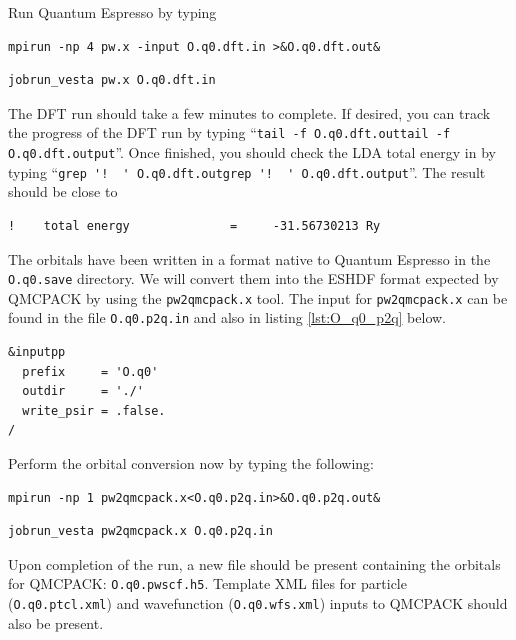 Run Quantum Espresso by typing 
\ifws
\begin{shaded}
\begin{verbatim}
mpirun -np 4 pw.x -input O.q0.dft.in >&O.q0.dft.out&
\end{verbatim}
\end{shaded}
\else
\begin{shaded}
\begin{verbatim}
jobrun_vesta pw.x O.q0.dft.in
\end{verbatim} 
\end{shaded}
\fi

The DFT run should take a few minutes to complete.  If desired, you can track the progress of the DFT run by typing ``\ifws\verb|tail -f O.q0.dft.out|\else\verb|tail -f O.q0.dft.output|\fi''. Once finished, you should check the LDA total energy in \texttt{} by typing ``\ifws\verb|grep '!  ' O.q0.dft.out|\else\verb|grep '!  ' O.q0.dft.output|\fi''.  The result should be close to
\begin{shaded}
\begin{verbatim}
!    total energy              =     -31.56730213 Ry
\end{verbatim}
\end{shaded} 

The orbitals have been written in a format native to Quantum Espresso in the \texttt{O.q0.save} directory.  We will convert them into the ESHDF format expected by QMCPACK by using the \texttt{pw2qmcpack.x} tool.  The input for \texttt{pw2qmcpack.x} can be found in the file \texttt{O.q0.p2q.in} and also in listing \ref{lst:O_q0_p2q} below. 

\begin{lstlisting}[caption={\texttt{pw2qmcpack.x} input file for orbital conversion (\texttt{O.q0.p2q.in})\label{lst:O_q0_p2q}}]
&inputpp
  prefix     = 'O.q0'
  outdir     = './'
  write_psir = .false.
/
\end{lstlisting}

Perform the orbital conversion now by typing the following:
\ifws
\begin{shaded}
\begin{verbatim}
mpirun -np 1 pw2qmcpack.x<O.q0.p2q.in>&O.q0.p2q.out&
\end{verbatim}
\end{shaded}
\else
\begin{shaded}
\begin{verbatim}
jobrun_vesta pw2qmcpack.x O.q0.p2q.in
\end{verbatim}
\end{shaded}
\fi
\noindent
Upon completion of the run, a new file should be present containing the orbitals for QMCPACK: \texttt{O.q0.pwscf.h5}.  Template XML files for particle (\texttt{O.q0.ptcl.xml}) and wavefunction (\texttt{O.q0.wfs.xml}) inputs to QMCPACK should also be present.  


